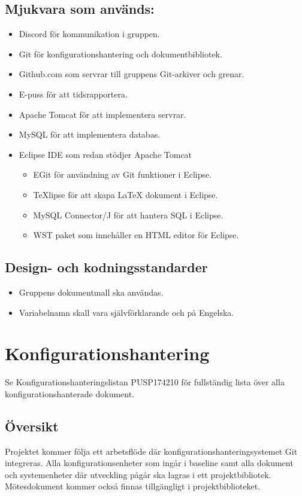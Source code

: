 \documentclass[paper=a4, fontsize=11pt,twoside]{article}
\begin{document}
\subsection*{Mjukvara som används:}
	\begin{itemize}
	\item Discord för kommunikation i gruppen.
	\item Git för konfigurationshantering och dokumentbibliotek.
	\item Github.com som servrar till gruppens Git-arkiver och grenar.
	\item E-puss för att tidsrapportera.
	\item Apache Tomcat för att implementera servrar.
	\item MySQL för att implementera databas.
	\item Eclipse IDE som redan stödjer Apache Tomcat
		\begin{itemize}
		\item EGit för användning av Git funktioner i Eclipse.
		\item TeXlipse för att skapa LaTeX dokument i Eclipse.
		\item MySQL Connector/J för att hantera SQL i Eclipse.
		\item WST paket som innehåller en HTML editor för Eclipse. 
		\end{itemize}
	\end{itemize}

\subsection*{Design- och kodningsstandarder}
	\begin{itemize}
	\item Gruppens dokumentmall ska användas.
	\item Variabelnamn skall vara självförklarande och på Engelska.
\end{itemize}



\section{Konfigurationshantering}

Se Konfigurationshanteringslistan PUSP174210 för fullständig lista över alla konfigurationshanterade dokument.

\subsection*{Översikt}
Projektet kommer följa ett arbetsflöde där konfigurationshanteringsystemet Git
integreras. Alla konfigurationsenheter som ingår i baseline samt alla dokument och systemenheter där utveckling pågår ska lagras i ett projektbibliotek. Mötesdokument kommer också finnas tillgängligt i projektbiblioteket.
 
\end{document}
